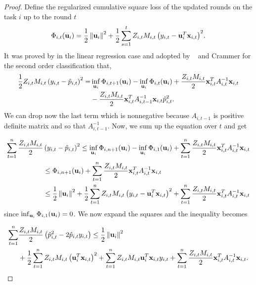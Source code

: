 \begin{proof}
Define the regularized cumulative square loss of the updated rounds on the task 
$i$ up to the round $t$
\begin{equation*}
\Phi_{i,t}(\mathbf{u}_i)=\frac{1}{2}\left\Vert {\mathbf{u}_i} \right\Vert^2+\frac{1}{2}\sum_{s=1}^{t}{Z_{i,t}M_{i,t}\left({y_{i,t}-\mathbf{u}_i^T\mathbf{x}_{i,t}}\right)}^2.
\end{equation*}
It was proved by \cite{Forster} in the linear regression case and adopted by
~\cite{cesa2006worst} and Crammer \cite{crammer2014doubly} for the second order classification that,
\begin{equation*}
\begin{split}
\frac{1}{2} Z_{i,t}M_{i,t}\left({y_{i,t}-\hat{p}_{i,t}}\right)^{2}= &\inf_{\mathbf{u}_i}{\Phi_{i,t+1}}(\mathbf{u}_i)-\inf_{\mathbf{u}_i}{\Phi_{i,t}}(\mathbf{u}_i)
+\frac{Z_{i,t}M_{i,t}}{2}\mathbf{x}_{i,t}^TA_{i,t}^{-1}\mathbf{x}_{i,t}\\
&-\frac{Z_{i,t}M_{i,t}}{2}\mathbf{x}_{i,t}^TA_{i,t-1}^{-1}\mathbf{x}_{i,t}\hat{p}_{i,t}^2.
\end{split}
\end{equation*} 
We can drop now the last term which is nonnegative because $A_{i,t-1}$ is 
positive definite matrix and so that $A_{i,t-1}^{-1}$.
Now, we sum up the equation over $t$ and get

\begin{equation*}
 \begin{split}
\sum_{t=1}^{n}\frac{Z_{i,t}M_{i,t}}{2}&\left({y_{i,t}-\hat{p}_{i,t}}\right)^{2} \le \inf_{\mathbf{u}_i}{\Phi_{i,n+1}}(\mathbf{u}_i)
-\inf_{\mathbf{u}_i}{\Phi_{i,1}}(\mathbf{u}_i)+\sum_{t=1}^{n}\frac{Z_{i,t}M_{i,t}}{2}\mathbf{x}_{i,t}^TA_{i,t}^{-1}\mathbf{x}_{i,t}\\
&\le  \Phi_{i,n+1}(\mathbf{u}_i)+\sum_{t=1}^{n}\frac{Z_{i,t}M_{i,t}}{2}\mathbf{x}_{i,t}^TA_{i,t}^{-1}\mathbf{x}_{i,t}\\
&\le  \frac{1}{2}\left\Vert {\mathbf{u}_i} \right\Vert^2+\frac{1}{2}\sum_{t=1}^{n}{Z_{i,t}M_{i,t}\left({y_{i,t}-\mathbf{u}_i^T\mathbf{x}_{i,t}}\right)}^2+
\sum_{t=1}^{n}\frac{Z_{i,t}M_{i,t}}{2}\mathbf{x}_{i,t}^TA_{i,t}^{-1}\mathbf{x}_{i,t}\\
\end{split}
\end{equation*} 
since $\inf_{\mathbf{u}_i}{\Phi_{i,1}}(\mathbf{u}_i)=0$. We now expand the squares and the 
inequality becomes

\begin{equation*}
 \begin{split}
   \sum_{t=1}^{n}&\frac{Z_{i,t}M_{i,t}}{2}\left({\hat{p}_{i,t}^2-2\hat{p}_{i,t}y_{i,t}}\right)
   \le  \frac{1}{2}\left\Vert {\mathbf{u}_i} \right\Vert^2 \\
   &+\frac{1}{2}\sum_{t=1}^{n}{Z_{i,t}M_{i,t}\left({\mathbf{u}_i^T\mathbf{x}_{i,t}}\right)}^2 
   +\sum_{t=1}^{n}{Z_{i,t}M_{i,t}\mathbf{u}_i^T\mathbf{x}_{i,t}y_{i,t}}
+\sum_{t=1}^{n}\frac{Z_{i,t}M_{i,t}}{2}\mathbf{x}_{i,t}^TA_{i,t}^{-1}\mathbf{x}_{i,t}.\\
\end{split}
\end{equation*} 


\end{proof}
